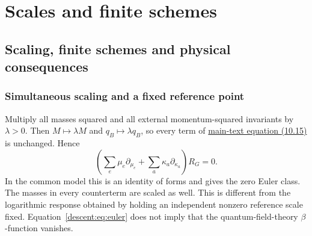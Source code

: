 \documentclass[11pt,a4paper,oneside]{article}
\theoremstyle{plain}
\theoremstyle{definition}
\theoremstyle{remark}
\newcommand{\Q}{\mathbb Q}
\newcommand{\im}{\operatorname{im}}
\newcommand{\Res}{\operatorname{Res}}
\newcommand{\dR}{\mathrm{dR}}
\numberwithin{equation}{section}
\newcommand{\otherref}[2]{\href{#1.pdf}{#2}}
\begin{document}
\endgroup


\section{Scales and finite schemes}\label{supp:descent}
\begingroup
\providecommand{\Q}{\mathbb Q}
\providecommand{\dR}{\mathrm{dR}}
\providecommand{\Res}{\operatorname{Res}}
\providecommand{\im}{\operatorname{im}}
\providecommand{\rk}{\operatorname{rk}}
\providecommand{\cR}{\mathcal R}
\providecommand{\cH}{\mathcal H}
\subsection{Scaling, finite schemes and physical consequences}
\subsubsection{Simultaneous scaling and a fixed reference point}
Multiply all masses squared and all external momentum-squared invariants by $\lambda>0$. Then $M\mapsto\lambda M$ and $q_B\mapsto\lambda q_B$, so every term of \otherref{feynman_periods_long_paper_en}{main-text equation (10.15)} is unchanged. Hence
\begin{equation}\label{descent:eq:euler}
 \left(\sum_e\mu_e\partial_{\mu_e}
              +\sum_a\kappa_a\partial_{\kappa_a}\right)R_G=0.
\end{equation}
In the common model this is an identity of forms and gives the zero Euler class. The masses in every counterterm are scaled as well. This is different from the logarithmic response obtained by holding an independent nonzero reference scale fixed. Equation~\eqref{descent:eq:euler} does not imply that the quantum-field-theory $\beta$-function vanishes.
\end{document}
